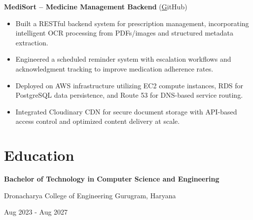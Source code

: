 \documentclass[11pt]{article}
\begin{document}
\textbf{ MediSort – Medicine Management Backend }
 (\href{https://GitHub}GitHub) 

\begin{itemize}


\item Built a RESTful backend system for prescription management, incorporating intelligent OCR processing from PDFs/images and structured metadata extraction.

\item Engineered a scheduled reminder system with escalation workflows and acknowledgment tracking to improve medication adherence rates.

\item Deployed on AWS infrastructure utilizing EC2 compute instances, RDS for PostgreSQL data persistence, and Route 53 for DNS-based service routing.

\item Integrated Cloudinary CDN for secure document storage with API-based access control and optimized content delivery at scale.


\end{itemize}








\section*{Education}



\textbf{ Bachelor of Technology in Computer Science and Engineering }

Dronacharya College of Engineering Gurugram, Haryana

{\small Aug 2023 - Aug 2027}

\vspace{4pt}





\end{document}
